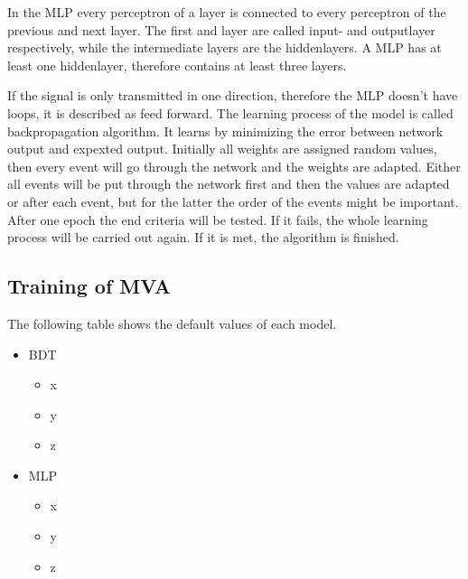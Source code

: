 \documentclass[11pt]{scrartcl}
\begin{document}
	In the MLP every perceptron of a layer is connected to every perceptron of the previous and next layer. The first and layer are called input- and outputlayer respectively, while the intermediate layers are the hiddenlayers. A MLP has at least one hiddenlayer, therefore contains at least three layers.
	
	If the signal is only transmitted in one direction, therefore the MLP doesn't have loops, it is described as feed forward. The learning process of the model is called backpropagation algorithm. It learns by minimizing the error between network output and expexted output. Initially all weights are assigned random values, then every event will go through the network and the weights are adapted. Either all events will be put through the network first and then the values are adapted or after each event, but for the latter the order of the events might be important. After one epoch the end criteria will be tested. If it fails, the whole learning process will be carried out again. If it is met, the algorithm is finished.
	
	\subsection{Training of MVA}
	
	The following table shows the default values of each model.
	
		\begin{itemize}
  			\item BDT
  					\begin{itemize}
  					\item x
  					\item y
  					\item z
  					\end{itemize}
  		  	\item MLP
  					\begin{itemize}
  					\item x
  					\item y
  					\item z
  					\end{itemize}		
		\end{itemize}
	
\end{document}
